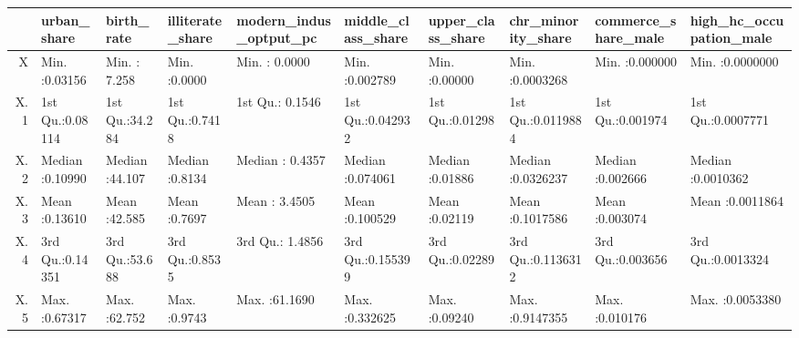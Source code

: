\begin{table}[ht]
\centering
\begin{tabular}{rlllllllll}
  \hline
 &  urban\_share &   birth\_rate & illiterate\_share & modern\_indus\_optput\_pc & middle\_class\_share & upper\_class\_share & chr\_minority\_share & commerce\_share\_male & high\_hc\_occupation\_male \\ 
  \hline
X & Min.   :0.03156   & Min.   : 7.258   & Min.   :0.0000   & Min.   : 0.0000   & Min.   :0.002789   & Min.   :0.00000   & Min.   :0.0003268   & Min.   :0.000000   & Min.   :0.0000000   \\ 
  X.1 & 1st Qu.:0.08114   & 1st Qu.:34.284   & 1st Qu.:0.7418   & 1st Qu.: 0.1546   & 1st Qu.:0.042932   & 1st Qu.:0.01298   & 1st Qu.:0.0119884   & 1st Qu.:0.001974   & 1st Qu.:0.0007771   \\ 
  X.2 & Median :0.10990   & Median :44.107   & Median :0.8134   & Median : 0.4357   & Median :0.074061   & Median :0.01886   & Median :0.0326237   & Median :0.002666   & Median :0.0010362   \\ 
  X.3 & Mean   :0.13610   & Mean   :42.585   & Mean   :0.7697   & Mean   : 3.4505   & Mean   :0.100529   & Mean   :0.02119   & Mean   :0.1017586   & Mean   :0.003074   & Mean   :0.0011864   \\ 
  X.4 & 3rd Qu.:0.14351   & 3rd Qu.:53.688   & 3rd Qu.:0.8535   & 3rd Qu.: 1.4856   & 3rd Qu.:0.155399   & 3rd Qu.:0.02289   & 3rd Qu.:0.1136312   & 3rd Qu.:0.003656   & 3rd Qu.:0.0013324   \\ 
  X.5 & Max.   :0.67317   & Max.   :62.752   & Max.   :0.9743   & Max.   :61.1690   & Max.   :0.332625   & Max.   :0.09240   & Max.   :0.9147355   & Max.   :0.010176   & Max.   :0.0053380   \\ 
   \hline
\end{tabular}
\end{table}
